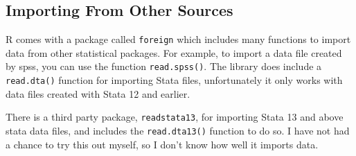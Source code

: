 \documentclass[12pt, oneside]{amsart}   	%
\begin{document}
\subsection{Importing From Other Sources}

R comes with a package called \texttt{foreign} which includes many functions to import data from other statistical packages. For example, to import a data file created by spss, you can use the function \texttt{read.spss()}. The library does include a \texttt{read.dta()} function for importing Stata files, unfortunately it only works with data files created with Stata 12 and earlier. 

There is a third party package, \texttt{readstata13}, for importing Stata 13 and above stata data files, and includes the \texttt{read.dta13()} function to do so. I have not had a chance to try this out myself, so I don't know how well it imports data.
\end{document}
